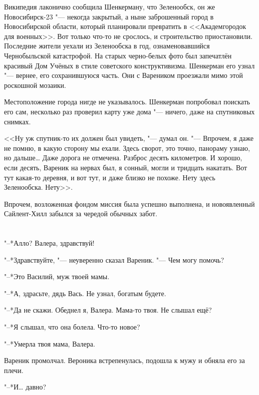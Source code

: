 Википедия лаконично сообщила Шенкерману, что Зеленообск, он же Новосибирск-23 "--- некогда закрытый, а ныне заброшенный город в Новосибирской области, который планировали превратить в <<Академгородок для военных>>.
Вот только что-то не срослось, и строительство приостановили.
Последние жители уехали из Зеленообска в год, ознаменовавшийся Чернобыльской катастрофой.
На старых черно-белых фото был запечатлён красивый Дом Учёных в стиле советского конструктивизма.
Шенкерман его узнал "--- вернее, его сохранившуюся часть.
Они с Вареником проезжали мимо этой роскошной мозаики.

Местоположение города нигде не указывалось.
Шенкерман попробовал поискать его сам, несколько раз проверил карту уже дома "--- ничего, даже на спутниковых снимках.

<<Ну уж спутник-то их должен был увидеть, "--- думал он.
"--- Впрочем, я даже не помню, в какую сторону мы ехали.
Здесь сворот, это точно, панораму узнаю, но дальше\ldots{}
Даже дорога не отмечена.
Разброс десять километров.
И хорошо, если десять, Вареник на нервах был, я сонный, могли и тридцать накатать.
Вот тут какая-то деревня, и вот тут, и даже близко не похоже.
Нету здесь Зеленообска.
Нету>>.

Впрочем, возложенная фондом миссия была успешно выполнена, и новоявленный Сайлент-Хилл забылся за чередой обычных забот.

\chapter{}

\label{Sat_2012_06_02}

\textspace

"--*Алло?
Валера, здравствуй!

"--*Здравствуйте, "--- неуверенно сказал Вареник.
"--- Чем могу помочь?

"--*Это Василий, муж твоей мамы.

"--*А, здрасьте, дядь Вась.
Не узнал, богатым будете.

"--*Да не скажи.
Обеднел я, Валера.
Мама-то твоя.
Не слышал ещё?

"--*Я слышал, что она болела.
Что-то новое?

"--*Умерла твоя мама, Валера.

Вареник промолчал.
Вероника встрепенулась, подошла к мужу и обняла его за плечи.

"--*И\ldots{} давно?

